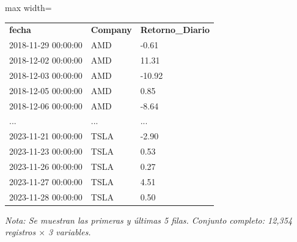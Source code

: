 

\begin{table}[htbp]

\centering

\begin{adjustbox}{max width=\textwidth}

\begin{tabular}{lll}

\rowcolor{ThemeBackground}
\rule{0pt}{0.45cm}
\textcolor{ThemeGold}{\bfseries fecha} & \textcolor{ThemeGold}{\bfseries Company} & \textcolor{ThemeGold}{\bfseries Retorno\_Diario} \\

2018-11-29 00:00:00 & AMD & -0.61 \\
2018-12-02 00:00:00 & AMD & 11.31 \\
2018-12-03 00:00:00 & AMD & -10.92 \\
2018-12-05 00:00:00 & AMD & 0.85 \\
2018-12-06 00:00:00 & AMD & -8.64 \\
... & ... & ... \\
2023-11-21 00:00:00 & TSLA & -2.90 \\
2023-11-23 00:00:00 & TSLA & 0.53 \\
2023-11-26 00:00:00 & TSLA & 0.27 \\
2023-11-27 00:00:00 & TSLA & 4.51 \\
2023-11-28 00:00:00 & TSLA & 0.50 \\
\bottomrule
\end{tabular}

\end{adjustbox}

\vspace{0.15cm}
{\raggedright\sffamily\footnotesize\color{ThemeMuted}
\textit{Nota: Se muestran las primeras y últimas 5 filas. Conjunto completo: 12,354 registros $\times$ 3 variables.}}

\end{table}
